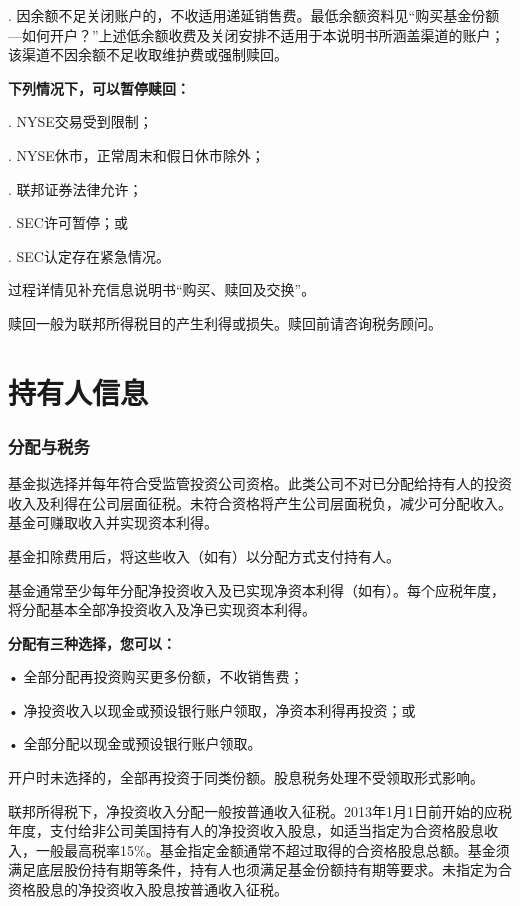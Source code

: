 \documentclass[UTF8,fontset=none,11pt,a4paper]{ctexart}
\begin{document}
. 因余额不足关闭账户的，不收适用递延销售费。最低余额资料见“购买基金份额—如何开户？”上述低余额收费及关闭安排不适用于本说明书所涵盖渠道的账户；该渠道不因余额不足收取维护费或强制赎回。


\textbf{下列情况下，可以暂停赎回：}

. NYSE交易受到限制；


. NYSE休市，正常周末和假日休市除外；


. 联邦证券法律允许；


. SEC许可暂停；或


. SEC认定存在紧急情况。


过程详情见补充信息说明书“购买、赎回及交换”。

赎回一般为联邦所得税目的产生利得或损失。赎回前请咨询税务顾问。


\par{}\label{originalpage21}
\section*{持有人信息}\label{unitU790}
\subsubsection*{分配与税务}\label{unitU791}
基金拟选择并每年符合受监管投资公司资格。此类公司不对已分配给持有人的投资收入及利得在公司层面征税。未符合资格将产生公司层面税负，减少可分配收入。基金可赚取收入并实现资本利得。

基金扣除费用后，将这些收入（如有）以分配方式支付持有人。

基金通常至少每年分配净投资收入及已实现净资本利得（如有）。每个应税年度，将分配基本全部净投资收入及净已实现资本利得。

\textbf{分配有三种选择，您可以：}

\noindent • 全部分配再投资购买更多份额，不收销售费；\par\smallskip
\noindent • 净投资收入以现金或预设银行账户领取，净资本利得再投资；或\par\smallskip
\noindent • 全部分配以现金或预设银行账户领取。\par\smallskip
开户时未选择的，全部再投资于同类份额。股息税务处理不受领取形式影响。

联邦所得税下，净投资收入分配一般按普通收入征税。2013年1月1日前开始的应税年度，支付给非公司美国持有人的净投资收入股息，如适当指定为合资格股息收入，一般最高税率15\%。基金指定金额通常不超过取得的合资格股息总额。基金须满足底层股份持有期等条件，持有人也须满足基金份额持有期等要求。未指定为合资格股息的净投资收入股息按普通收入征税。
\end{document}
